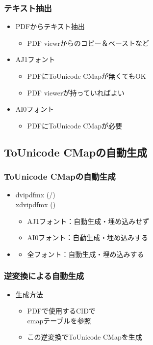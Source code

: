 \begin{frame}\frametitle{テキスト抽出}
  \begin{itemize}
  \item PDFからテキスト抽出
    \begin{itemize}
    \item PDF viewrからのコピー＆ペーストなど
    \end{itemize}
  \item AJ1フォント
    \begin{itemize}
    \item PDFにToUnicode CMapが無くてもOK
    \item PDF viewerが持っていればよい
    \end{itemize}
  \item AI0フォント
    \begin{itemize}
    \item PDFにToUnicode CMapが必要
    \end{itemize}
  \end{itemize}
\end{frame}

\subsection{ToUnicode CMapの自動生成}
\begin{frame}\frametitle{ToUnicode CMapの自動生成}
  \begin{itemize}
  \item dvipdfmx (\pTeX /\upTeX ) \\
    xdvipdfmx (\XeTeX )
    \begin{itemize}
    \item AJ1フォント：自動生成・埋め込みせず
    \item AI0フォント：自動生成・埋め込みする
    \end{itemize}
  \item \LuaTeX
    \begin{itemize}
    \item 全フォント：自動生成・埋め込みする
    \end{itemize}
  \end{itemize}
\end{frame}

\begin{frame}\frametitle{逆変換による自動生成}
  \begin{itemize}
  \item 生成方法
    \begin{itemize}
    \item PDFで使用するCIDで \\
      cmapテーブルを参照
    \item この逆変換でToUnicode CMapを生成
    \end{itemize}
  \end{itemize}
\end{frame}

